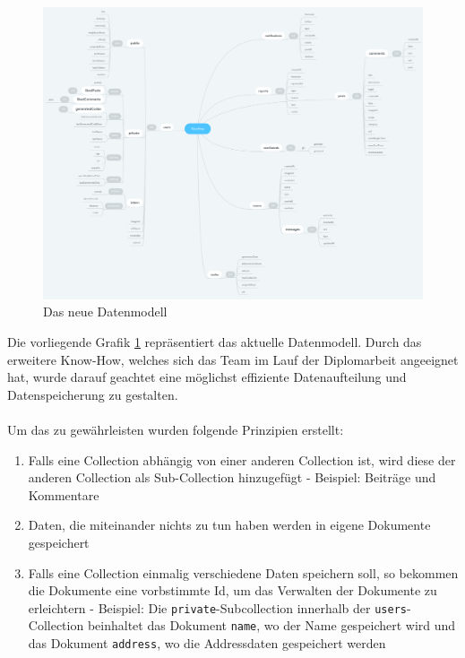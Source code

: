 \begin{figure}[h]
  \centering
  \includegraphics[width=1\textwidth]{pics/nochba-erd-new.png}
  \caption{Das neue Datenmodell}
  \label{fig:new-erd}
\end{figure}

Die vorliegende Grafik \ref{fig:new-erd} repräsentiert das aktuelle Datenmodell. Durch das erweitere Know-How, welches sich das Team im Lauf der Diplomarbeit angeeignet hat, wurde darauf geachtet eine möglichst effiziente Datenaufteilung und Datenspeicherung zu gestalten.
\\\\
Um das zu gewährleisten wurden folgende Prinzipien erstellt:
\begin{enumerate}
  \item Falls eine Collection abhängig von einer anderen Collection ist, wird diese der anderen Collection als Sub-Collection hinzugefügt - Beispiel: Beiträge und Kommentare
  \item Daten, die miteinander nichts zu tun haben werden in eigene Dokumente gespeichert
  \item Falls eine Collection einmalig verschiedene Daten speichern soll, so bekommen die Dokumente eine vorbstimmte Id, um das Verwalten der Dokumente zu erleichtern - Beispiel: Die \texttt{private}-Subcollection innerhalb der \texttt{users}-Collection beinhaltet das Dokument \texttt{name}, wo der Name gespeichert wird und das Dokument \texttt{address}, wo die Addressdaten gespeichert werden

\end{enumerate}

